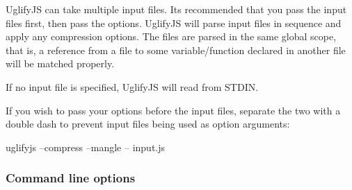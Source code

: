 Uglify\+JS can take multiple input files. It\textquotesingle{}s recommended that you pass the input files first, then pass the options. Uglify\+JS will parse input files in sequence and apply any compression options. The files are parsed in the same global scope, that is, a reference from a file to some variable/function declared in another file will be matched properly.

If no input file is specified, Uglify\+JS will read from S\+T\+D\+IN.

If you wish to pass your options before the input files, separate the two with a double dash to prevent input files being used as option arguments\+: \begin{DoxyVerb}uglifyjs --compress --mangle -- input.js
\end{DoxyVerb}


\subsubsection*{Command line options}

